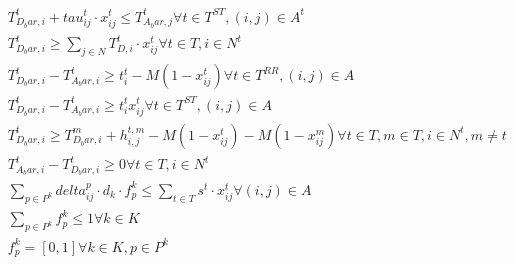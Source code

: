 \begin{align}
  & T_{D_bar , i}^{t} + \mathit{tau}_{i j}^{t} \cdot x_{i j}^{t} \leq T_{A_bar , j}^{t} \forall t \in T^{S T} , \left(i , j\right) \in A^{t} \tag{eq\_0016} \\
  & T_{D_bar , i}^{t} \geq \sum_{j \in N} T_{D , i}^{t} \cdot x_{i j}^{t} \forall t \in T , i \in N^{t} \tag{eq\_0017} \\
  & T_{D_bar , i}^{t} - T_{A_bar , i}^{t} \geq t_{i}^{t} - M \left(1 - x_{i j}^{t}\right) \forall t \in T^{R R} , \left(i , j\right) \in A \tag{eq\_0018} \\
  & T_{D_bar , i}^{t} - T_{A_bar , i}^{t} \geq t_{i}^{t} x_{i j}^{t} \forall t \in T^{S T} , \left(i , j\right) \in A \tag{eq\_0019} \\
  & T_{D_bar , i}^{t} \geq T_{D_bar , i}^{m} + h_{i , j}^{t , m} - M \left(1 - x_{i j}^{t}\right) - M \left(1 - x_{i j}^{m}\right) \forall t \in T , m \in T , i \in N^{t} , m \neq t \tag{eq\_0020} \\
  & T_{A_bar , i}^{t} - T_{D_bar , i}^{t} \geq 0 \forall t \in T , i \in N^{t} \tag{eq\_0021} \\
  & \sum_{p \in P^{k}} \mathit{delta}_{i j}^{p} \cdot d_{k} \cdot f_{p}^{k} \leq \sum_{t \in T} s^{t} \cdot x_{i j}^{t} \forall \left(i , j\right) \in A \tag{eq\_0022} \\
  & \sum_{p \in P^{k}} f_{p}^{k} \leq 1 \forall k \in K \tag{eq\_0023} \\
  & f_{p}^{k} = \left[0 , 1\right] \forall k \in K , p \in P^{k} \tag{eq\_0025} \\
\end{align}
